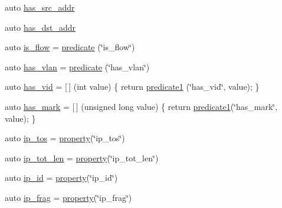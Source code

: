 \begin{DoxyCompactItemize}
\item 
auto \hyperlink{namespacepfq__lang_1_1anonymous__namespace_02default_8hpp_03_aabc75799de679df702f4179ead82114c}{has\-\_\-src\-\_\-addr}
\item 
auto \hyperlink{namespacepfq__lang_1_1anonymous__namespace_02default_8hpp_03_af223a0513ceffa69c0b8535a7cca12da}{has\-\_\-dst\-\_\-addr}
\item 
auto \hyperlink{namespacepfq__lang_1_1anonymous__namespace_02default_8hpp_03_a32aab6804e2daac2458f7c050ed69cf1}{is\-\_\-flow} = \hyperlink{namespacepfq__lang_abd58b2244ff8b0775a3b5865bc128872}{predicate} (\char`\"{}is\-\_\-flow\char`\"{})
\item 
auto \hyperlink{namespacepfq__lang_1_1anonymous__namespace_02default_8hpp_03_a30a0c8d9bcd28cd17c6c1699c3339c3f}{has\-\_\-vlan} = \hyperlink{namespacepfq__lang_abd58b2244ff8b0775a3b5865bc128872}{predicate} (\char`\"{}has\-\_\-vlan\char`\"{})
\item 
auto \hyperlink{namespacepfq__lang_1_1anonymous__namespace_02default_8hpp_03_adddd2dea56164719f2853af158911a80}{has\-\_\-vid} = \mbox{[}$\,$\mbox{]} (int value) \{ return \hyperlink{namespacepfq__lang_ae23a03cee94b5ddfde4a8d2e5c521f0e}{predicate1} (\char`\"{}has\-\_\-vid\char`\"{}, value); \}
\item 
auto \hyperlink{namespacepfq__lang_1_1anonymous__namespace_02default_8hpp_03_a0f9dc3f39bf9793e766b6312718483f1}{has\-\_\-mark} = \mbox{[}$\,$\mbox{]} (unsigned long value) \{ return \hyperlink{namespacepfq__lang_ae23a03cee94b5ddfde4a8d2e5c521f0e}{predicate1}(\char`\"{}has\-\_\-mark\char`\"{}, value); \}
\item 
auto \hyperlink{namespacepfq__lang_1_1anonymous__namespace_02default_8hpp_03_afc29e9877341008196788bba2bde3e04}{ip\-\_\-tos} = \hyperlink{namespacepfq__lang_ad70b40071ed0fd32c05ab8e82bbfec61}{property}(\char`\"{}ip\-\_\-tos\char`\"{})
\item 
auto \hyperlink{namespacepfq__lang_1_1anonymous__namespace_02default_8hpp_03_a172d424ed5943dda09a80d7c63be9490}{ip\-\_\-tot\-\_\-len} = \hyperlink{namespacepfq__lang_ad70b40071ed0fd32c05ab8e82bbfec61}{property}(\char`\"{}ip\-\_\-tot\-\_\-len\char`\"{})
\item 
auto \hyperlink{namespacepfq__lang_1_1anonymous__namespace_02default_8hpp_03_a7e1fd2e2131451ca8afe2f8ab07b97a8}{ip\-\_\-id} = \hyperlink{namespacepfq__lang_ad70b40071ed0fd32c05ab8e82bbfec61}{property}(\char`\"{}ip\-\_\-id\char`\"{})
\item 
auto \hyperlink{namespacepfq__lang_1_1anonymous__namespace_02default_8hpp_03_a29f207a5d209c3968f5d2e8f3c19c239}{ip\-\_\-frag} = \hyperlink{namespacepfq__lang_ad70b40071ed0fd32c05ab8e82bbfec61}{property}(\char`\"{}ip\-\_\-frag\char`\"{})

\end{DoxyCompactItemize}
